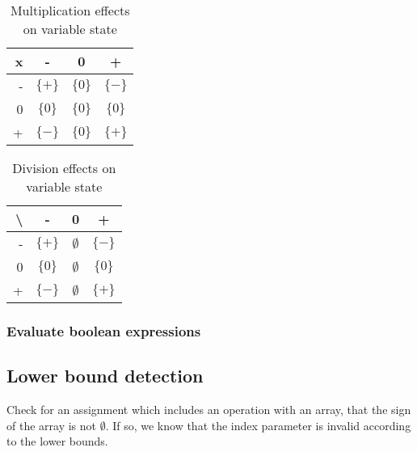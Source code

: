 \begin{table}[h]
\begin{tabular}{| r | c | c | c |}
\hline
 x   & -           & 0 & + \\
\hline
 -  & $\{+\}$ & $\{0\}$ & $\{-\}$ \\
\hline
 0  & $\{0\}$ & $\{0\}$ & $\{0\}$ \\
\hline
 +  & $\{-\}$ & $\{0\}$ & $\{+\}$ \\
\hline
\end{tabular}
\centering
\caption{Multiplication effects on variable state}
\label{table:arithmetic_multiply}
\end{table}

\begin{table}[h]
\begin{tabular}{| r | c | c | c |}
\hline
 \textbackslash   & -           & 0 & + \\
\hline
 -  & $\{+\}$ & $\emptyset$ & $\{-\}$ \\
\hline
 0  & $\{0\}$ & $\emptyset$ & $\{0\}$ \\
\hline
 +  & $\{-\}$ & $\emptyset$ & $\{+\}$ \\
\hline
\end{tabular}
\centering
\caption{Division effects on variable state}
\label{table:arithmetic_division}
\end{table}

\subsubsection{Evaluate boolean expressions}


\subsection{Lower bound detection}
Check for an assignment which includes an operation with an array, that the sign of the array is not $\emptyset$. If so, we know that the index parameter is invalid according to the lower bounds.

